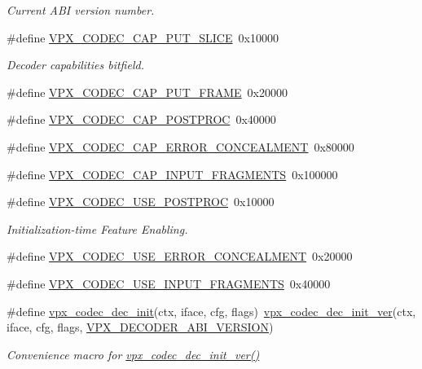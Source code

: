 \begin{DoxyCompactItemize}
\begin{DoxyCompactList}\small\item\em Current A\-B\-I version number. \end{DoxyCompactList}\item 
\#define \hyperlink{group__decoder_ga9e33b8ee81025d5fc3d01b0975ad5f96}{V\-P\-X\-\_\-\-C\-O\-D\-E\-C\-\_\-\-C\-A\-P\-\_\-\-P\-U\-T\-\_\-\-S\-L\-I\-C\-E}~0x10000
\begin{DoxyCompactList}\small\item\em Decoder capabilities bitfield. \end{DoxyCompactList}\item 
\#define \hyperlink{group__decoder_ga0ef59ca8067ac1dc8c8378042277ccc8}{V\-P\-X\-\_\-\-C\-O\-D\-E\-C\-\_\-\-C\-A\-P\-\_\-\-P\-U\-T\-\_\-\-F\-R\-A\-M\-E}~0x20000
\item 
\#define \hyperlink{group__decoder_ga7825ade982ab85a5583d3d8a669baa3b}{V\-P\-X\-\_\-\-C\-O\-D\-E\-C\-\_\-\-C\-A\-P\-\_\-\-P\-O\-S\-T\-P\-R\-O\-C}~0x40000
\item 
\#define \hyperlink{group__decoder_gac44cd9e4722e1eb32a37c3eaec8d97b9}{V\-P\-X\-\_\-\-C\-O\-D\-E\-C\-\_\-\-C\-A\-P\-\_\-\-E\-R\-R\-O\-R\-\_\-\-C\-O\-N\-C\-E\-A\-L\-M\-E\-N\-T}~0x80000
\item 
\#define \hyperlink{group__decoder_gae89cbd3e8089803c6f4a67fc67a8c531}{V\-P\-X\-\_\-\-C\-O\-D\-E\-C\-\_\-\-C\-A\-P\-\_\-\-I\-N\-P\-U\-T\-\_\-\-F\-R\-A\-G\-M\-E\-N\-T\-S}~0x100000
\item 
\#define \hyperlink{group__decoder_ga6fe14f30254aff769412b128b29664cc}{V\-P\-X\-\_\-\-C\-O\-D\-E\-C\-\_\-\-U\-S\-E\-\_\-\-P\-O\-S\-T\-P\-R\-O\-C}~0x10000
\begin{DoxyCompactList}\small\item\em Initialization-\/time Feature Enabling. \end{DoxyCompactList}\item 
\#define \hyperlink{group__decoder_ga520d7005e360202f5844982fa2392581}{V\-P\-X\-\_\-\-C\-O\-D\-E\-C\-\_\-\-U\-S\-E\-\_\-\-E\-R\-R\-O\-R\-\_\-\-C\-O\-N\-C\-E\-A\-L\-M\-E\-N\-T}~0x20000
\item 
\#define \hyperlink{group__decoder_ga378855a0318396d6e4e585bd3bacbf3f}{V\-P\-X\-\_\-\-C\-O\-D\-E\-C\-\_\-\-U\-S\-E\-\_\-\-I\-N\-P\-U\-T\-\_\-\-F\-R\-A\-G\-M\-E\-N\-T\-S}~0x40000
\item 
\#define \hyperlink{group__decoder_ga8c2f0b12f1bd4927eb3c68b01eab19d3}{vpx\-\_\-codec\-\_\-dec\-\_\-init}(ctx, iface, cfg, flags)~\hyperlink{group__decoder_ga26fe82cf8fd697f885935cea53be964f}{vpx\-\_\-codec\-\_\-dec\-\_\-init\-\_\-ver}(ctx, iface, cfg, flags, \hyperlink{group__decoder_ga462b459e7ae13937e1eae1776245db12}{V\-P\-X\-\_\-\-D\-E\-C\-O\-D\-E\-R\-\_\-\-A\-B\-I\-\_\-\-V\-E\-R\-S\-I\-O\-N})
\begin{DoxyCompactList}\small\item\em Convenience macro for \hyperlink{group__decoder_ga26fe82cf8fd697f885935cea53be964f}{vpx\-\_\-codec\-\_\-dec\-\_\-init\-\_\-ver()} \end{DoxyCompactList}\end{DoxyCompactItemize}
